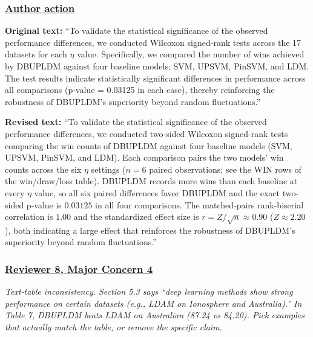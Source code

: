 \documentclass[journal,12pt, onecolumn]{IEEEtran}
\begin{document}
{\color{black}
\subsubsection*{\textbf{\underline{Author action}}}
\begin{center}
{\color{red}}
\end{center}
\textbf{Original text:} ``To validate the statistical significance of the observed performance differences, we conducted Wilcoxon signed-rank tests across the 17 datasets for each $\eta$ value. Specifically, we compared the number of wins achieved by DBUPLDM against four baseline models: SVM, UPSVM, PinSVM, and LDM. The test results indicate statistically significant differences in performance across all comparisons (p-value = 0.03125 in each case), thereby reinforcing the robustness of DBUPLDM’s superiority beyond random fluctuations.''

\textbf{Revised text:} ``{\color{red}To validate the statistical significance of the observed performance differences, we conducted two-sided Wilcoxon signed-rank tests comparing the win counts of DBUPLDM against four baseline models (SVM, UPSVM, PinSVM, and LDM). Each comparison pairs the two models' win counts across the six $\eta$ settings ($n=6$ paired observations; see the WIN rows of the win/draw/loss table). DBUPLDM records more wins than each baseline at every $\eta$ value, so all six paired differences favor DBUPLDM and the exact two-sided p-value is $0.03125$ in all four comparisons. The matched-pairs rank-biserial correlation is $1.00$ and the standardized effect size is $r=Z/\sqrt{n}\approx 0.90$ ($Z\approx 2.20$), both indicating a large effect that reinforces the robustness of DBUPLDM's superiority beyond random fluctuations.}''
}



{\color{customgreen}
\subsubsection*{\underline{\textbf{Reviewer 8, Major Concern 4}}}
\emph{Text-table inconsistency. Section 5.3 says ``deep learning methods show strong performance on certain datasets (e.g., LDAM on Ionosphere and Australia).'' In Table 7, DBUPLDM beats LDAM on Australian (87.24 vs 84.20). Pick examples that actually match the table, or remove the specific claim.}
}
\end{document}
